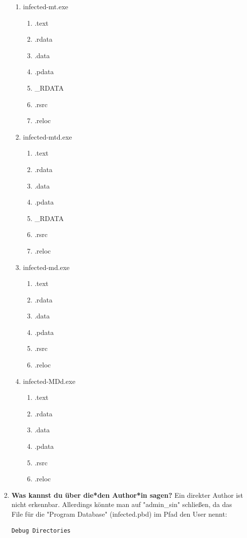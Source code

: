 \documentclass{article}
\begin{document}
\begin{enumerate}
		\begin{enumerate}
			\item infected-mt.exe
			\begin{enumerate}
				\item .text
				\item .rdata
				\item .data
				\item .pdata
				\item \_RDATA
				\item .rsrc
				\item .reloc
			\end{enumerate}
			\item infected-mtd.exe
			\begin{enumerate}
				\item .text
				\item .rdata
				\item .data
				\item .pdata
				\item \_RDATA
				\item .rsrc
				\item .reloc
			\end{enumerate}
			\item infected-md.exe
			\begin{enumerate}
				\item .text
				\item .rdata
				\item .data
				\item .pdata
				\item .rsrc
				\item .reloc
			\end{enumerate}
			\item infected-MDd.exe
			\begin{enumerate}
				\item .text
				\item .rdata
				\item .data
				\item .pdata
				\item .rsrc
				\item .reloc
			\end{enumerate}
		\end{enumerate}
		
		\pagebreak
		
		\item \textbf{Was kannst du über die*den Author*in sagen?}
		Ein direkter Author ist nicht erkennbar. Allerdings könnte man auf "admin\_sin" schließen, da das File für die "Program Database" (infected.pbd) im Pfad den User nennt:\\
		\begin{lstlisting}[language=c]
			 Debug Directories
			

\end{lstlisting}
\end{enumerate}
\end{document}
